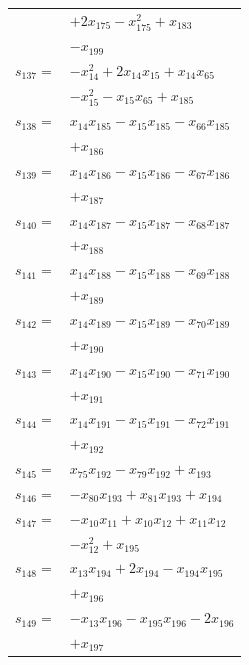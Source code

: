 \begin{longtable}{@{}r@{\;}l@{}}
 & \(\displaystyle +2x_{175} -x_{175}^{2} +x_{183}\) \\
 & \(\displaystyle -x_{199}\) \\[3pt]
\(s_{137}=\) & \(\displaystyle -x_{14}^{2} +2x_{14}x_{15} +x_{14}x_{65}\) \\
 & \(\displaystyle -x_{15}^{2} -x_{15}x_{65} +x_{185}\) \\[3pt]
\(s_{138}=\) & \(\displaystyle x_{14}x_{185} -x_{15}x_{185} -x_{66}x_{185}\) \\
 & \(\displaystyle +x_{186}\) \\[3pt]
\(s_{139}=\) & \(\displaystyle x_{14}x_{186} -x_{15}x_{186} -x_{67}x_{186}\) \\
 & \(\displaystyle +x_{187}\) \\[3pt]
\(s_{140}=\) & \(\displaystyle x_{14}x_{187} -x_{15}x_{187} -x_{68}x_{187}\) \\
 & \(\displaystyle +x_{188}\) \\[3pt]
\(s_{141}=\) & \(\displaystyle x_{14}x_{188} -x_{15}x_{188} -x_{69}x_{188}\) \\
 & \(\displaystyle +x_{189}\) \\[3pt]
\(s_{142}=\) & \(\displaystyle x_{14}x_{189} -x_{15}x_{189} -x_{70}x_{189}\) \\
 & \(\displaystyle +x_{190}\) \\[3pt]
\(s_{143}=\) & \(\displaystyle x_{14}x_{190} -x_{15}x_{190} -x_{71}x_{190}\) \\
 & \(\displaystyle +x_{191}\) \\[3pt]
\(s_{144}=\) & \(\displaystyle x_{14}x_{191} -x_{15}x_{191} -x_{72}x_{191}\) \\
 & \(\displaystyle +x_{192}\) \\[3pt]
\(s_{145}=\) & \(\displaystyle x_{75}x_{192} -x_{79}x_{192} +x_{193}\) \\[3pt]
\(s_{146}=\) & \(\displaystyle -x_{80}x_{193} +x_{81}x_{193} +x_{194}\) \\[3pt]
\(s_{147}=\) & \(\displaystyle -x_{10}x_{11} +x_{10}x_{12} +x_{11}x_{12}\) \\
 & \(\displaystyle -x_{12}^{2} +x_{195}\) \\[3pt]
\(s_{148}=\) & \(\displaystyle x_{13}x_{194} +2x_{194} -x_{194}x_{195}\) \\
 & \(\displaystyle +x_{196}\) \\[3pt]
\(s_{149}=\) & \(\displaystyle -x_{13}x_{196} -x_{195}x_{196} -2x_{196}\) \\
 & \(\displaystyle +x_{197}\) \\[3pt]

\end{longtable}
